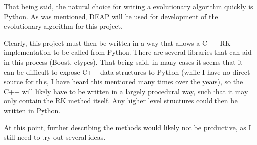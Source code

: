 \documentclass[onecolumn,titlepage,letterpaper,10pt]{article}
\begin{document}
That being said, the natural choice for writing a evolutionary algorithm
quickly is Python. As was mentioned, DEAP \cite{DEAP} will be used for
development of the evolutionary algorithm for this project.

Clearly, this project must then be written in a way that allows a C++ RK
implementation to be called from Python. There are several libraries that can
aid in this process
(Boost, ctypes). That being said, in many cases it seems that it can be
difficult to expose C++ data structures to Python (while I have no direct source
for this, I have heard this mentioned many times over the years), so the C++
will likely have to be written in a largely procedural way, such that it may
only contain the RK method itself. Any higher level structures could then be
written in Python.

At this point, further describing the methods would likely not be productive,
as I still need to try out several ideas.



\end{document}
